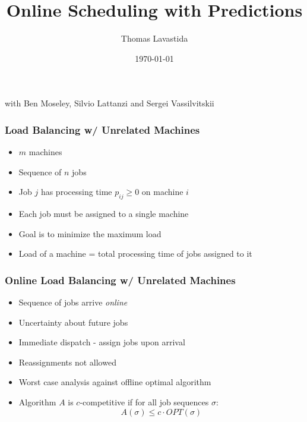 \documentclass{beamer}
\title[Scheduling w/ Predictions]{Online Scheduling with Predictions} %
\author{Thomas Lavastida} %
\institute[CMU] %
{
Carnegie Mellon University \\ %
\medskip
\textit{tlavastida@cmu.edu} %
}
\date{\today} %
\begin{document}
\begin{frame}
\titlepage %
 \begin{center} with Ben Moseley, Silvio Lattanzi and Sergei Vassilvitskii \end{center}
\end{frame}




\begin{frame}
\frametitle{Load Balancing w/ Unrelated Machines}

\begin{itemize}
\item $m$ machines
\item Sequence of $n$ jobs
\pause
\item Job $j$ has processing time $p_{ij}\geq 0$ on machine $i$
\pause
\item Each job must be assigned to a single machine
\pause
\item Goal is to minimize the maximum load
\item Load of a machine = total processing time of jobs assigned to it

\end{itemize}

\end{frame}

\begin{frame}
\frametitle{Online Load Balancing w/ Unrelated Machines}

\begin{itemize}
\item Sequence of jobs arrive \emph{online}
\item Uncertainty about future jobs
\pause
\item Immediate dispatch - assign jobs upon arrival
\item Reassignments not allowed
\pause
\item Worst case analysis against offline optimal algorithm
\item Algorithm $A$ is $c$-competitive if for all job sequences $\sigma$:
\[
A(\sigma) \leq c \cdot OPT(\sigma)
\]
\end{itemize}

\end{frame}
\end{document}
